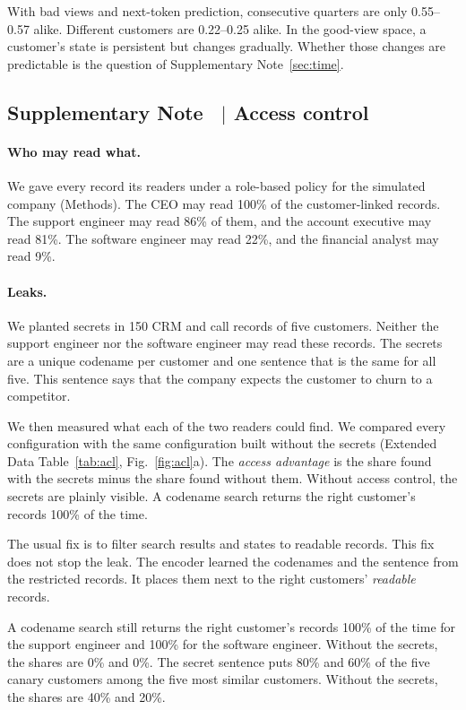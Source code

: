 \documentclass[11pt]{article}
\newcounter{suppnote}
\newcommand{\suppnote}[2]{\refstepcounter{suppnote}\label{#2}\subsection{Supplementary Note \thesuppnote\ $|$ #1}}
\begin{document}
With bad views and next-token prediction, consecutive quarters are only 0.55--0.57 alike. Different customers are 0.22--0.25 alike. In the good-view space, a customer's state is persistent but changes gradually. Whether those changes are predictable is the question of Supplementary Note~\ref{sec:time}.

\suppnote{Access control}{sec:acl-results}
\paragraph{Who may read what.} We gave every record its readers under a role-based policy for the simulated company (Methods). The CEO may read 100\% of the customer-linked records. The support engineer may read 86\% of them, and the account executive may read 81\%. The software engineer may read 22\%, and the financial analyst may read 9\%.

\paragraph{Leaks.} We planted secrets in 150 CRM and call records of five customers. Neither the support engineer nor the software engineer may read these records. The secrets are a unique codename per customer and one sentence that is the same for all five. This sentence says that the company expects the customer to churn to a competitor.

We then measured what each of the two readers could find. We compared every configuration with the same configuration built without the secrets (Extended Data Table~\ref{tab:acl}, Fig.~\ref{fig:acl}a). The \emph{access advantage} is the share found with the secrets minus the share found without them. Without access control, the secrets are plainly visible. A codename search returns the right customer's records 100\% of the time.

The usual fix is to filter search results and states to readable records. This fix does not stop the leak. The encoder learned the codenames and the sentence from the restricted records. It places them next to the right customers' \emph{readable} records.

A codename search still returns the right customer's records 100\% of the time for the support engineer and 100\% for the software engineer. Without the secrets, the shares are 0\% and 0\%. The secret sentence puts 80\% and 60\% of the five canary customers among the five most similar customers. Without the secrets, the shares are 40\% and 20\%.
\end{document}
